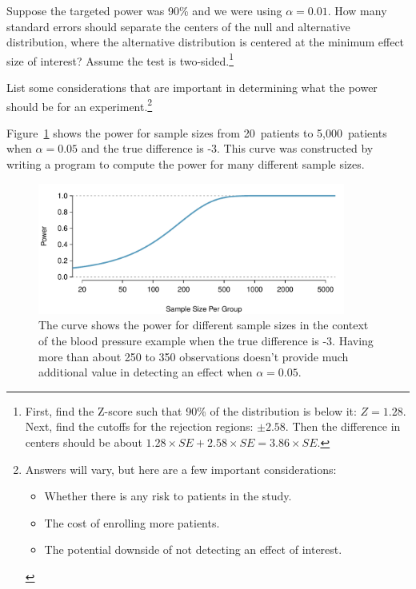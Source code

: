 \begin{exercise}
Suppose the targeted power was 90\% and we were using $\alpha = 0.01$. How many standard errors should separate the centers of the null and alternative distribution, where the alternative distribution is centered at the minimum effect size of interest? Assume the test is two-sided.\footnote{First, find the Z-score such that 90\% of the distribution is below it: $Z = 1.28$. Next, find the cutoffs for the rejection regions: $\pm 2.58$. Then the difference in centers should be about $1.28 \times SE + 2.58 \times SE = 3.86 \times SE$.}
\end{exercise}

\begin{exercise}
List some considerations that are important in determining what the power should be for an experiment.\footnote{Answers will vary, but here are a few important considerations:
\begin{itemize}
\setlength{\itemsep}{0mm}
\item Whether there is any risk to patients in the study.
\item The cost of enrolling more patients.
\item The potential downside of not detecting an effect of interest.
\end{itemize}}
\end{exercise}

Figure~\ref{power_curve_neg-3} shows the power for sample sizes from 20~patients to 5,000~patients when $\alpha = 0.05$ and the true difference is -3. This curve was constructed by writing a program to compute the power for many different sample sizes.

\begin{figure}[h]
\centering
\includegraphics[width=0.9\textwidth]{ch_inference_for_means/figures/power_curve/power_curve_neg-3}
\caption{The curve shows the power for different sample sizes in the context of the blood pressure example when the true difference is -3. Having more than about 250 to 350 observations doesn't provide much additional value in detecting an effect when $\alpha = 0.05$.}
\label{power_curve_neg-3}
\end{figure}

